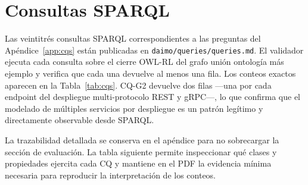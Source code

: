 \documentclass[Afour,sagev,times]{sagej}
\newcommand{\code}[1]{\texttt{#1}}
\begin{document}
\section{Consultas SPARQL}\label{app:sparql}

Las veintitrés consultas SPARQL correspondientes a las preguntas del Apéndice~\ref{app:cqs} están publicadas en \code{daimo/queries/queries.md}. El validador ejecuta cada consulta sobre el cierre OWL-RL del grafo unión ontología más ejemplo y verifica que cada una devuelve al menos una fila. Los conteos exactos aparecen en la Tabla~\ref{tab:cqs}. CQ-G2 devuelve dos filas ---una por cada endpoint del despliegue multi-protocolo REST y gRPC---, lo que confirma que el modelado de múltiples servicios por despliegue es un patrón legítimo y directamente observable desde SPARQL.

La trazabilidad detallada se conserva en el apéndice para no sobrecargar la sección de evaluación. La tabla siguiente permite inspeccionar qué clases y propiedades ejercita cada CQ y mantiene en el PDF la evidencia mínima necesaria para reproducir la interpretación de los conteos.
\end{document}
